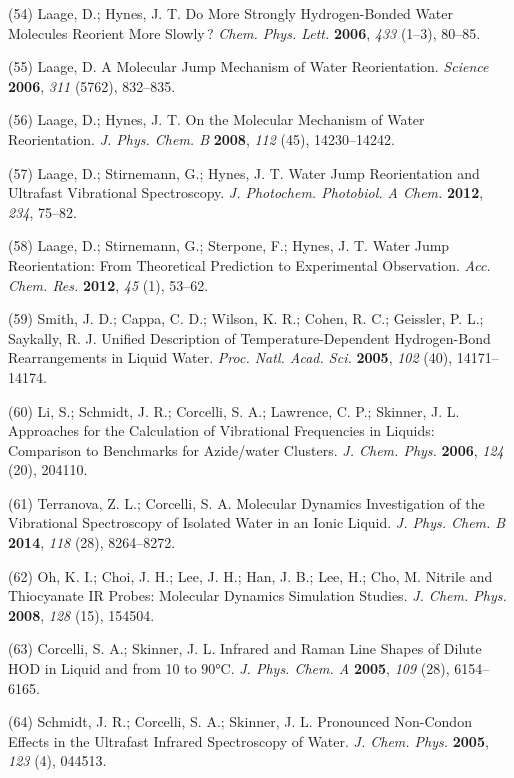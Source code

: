 \documentclass[]{article}
\begin{document}
(54) Laage, D.; Hynes, J. T. Do More Strongly Hydrogen-Bonded Water Molecules Reorient More Slowly\,? \emph{Chem. Phys. Lett.}  \textbf{2006}, \emph{433} (1--3), 80--85.

(55) Laage, D. A Molecular Jump Mechanism of Water Reorientation.  \emph{Science} \textbf{2006}, \emph{311} (5762), 832--835.

(56) Laage, D.; Hynes, J. T. On the Molecular Mechanism of Water Reorientation. \emph{J. Phys. Chem. B} \textbf{2008}, \emph{112} (45), 14230--14242.

(57) Laage, D.; Stirnemann, G.; Hynes, J. T. Water Jump Reorientation and Ultrafast Vibrational Spectroscopy. \emph{J. Photochem. Photobiol. A Chem.} \textbf{2012}, \emph{234}, 75--82.

(58) Laage, D.; Stirnemann, G.; Sterpone, F.; Hynes, J. T. Water Jump Reorientation: From Theoretical Prediction to Experimental Observation.  \emph{Acc. Chem. Res.} \textbf{2012}, \emph{45} (1), 53--62.

(59) Smith, J. D.; Cappa, C. D.; Wilson, K. R.; Cohen, R. C.; Geissler, P. L.; Saykally, R. J. Unified Description of Temperature-Dependent Hydrogen-Bond Rearrangements in Liquid Water. \emph{Proc. Natl. Acad.  Sci.} \textbf{2005}, \emph{102} (40), 14171--14174.

(60) Li, S.; Schmidt, J. R.; Corcelli, S. A.; Lawrence, C. P.; Skinner, J. L. Approaches for the Calculation of Vibrational Frequencies in Liquids: Comparison to Benchmarks for Azide/water Clusters. \emph{J.  Chem. Phys.} \textbf{2006}, \emph{124} (20), 204110.

(61) Terranova, Z. L.; Corcelli, S. A. Molecular Dynamics Investigation of the Vibrational Spectroscopy of Isolated Water in an Ionic Liquid.  \emph{J. Phys. Chem. B} \textbf{2014}, \emph{118} (28), 8264--8272.

(62) Oh, K. I.; Choi, J. H.; Lee, J. H.; Han, J. B.; Lee, H.; Cho, M.  Nitrile and Thiocyanate IR Probes: Molecular Dynamics Simulation Studies. \emph{J. Chem. Phys.} \textbf{2008}, \emph{128} (15), 154504.

(63) Corcelli, S. A.; Skinner, J. L. Infrared and Raman Line Shapes of Dilute HOD in Liquid  and  from 10 to 90°C. \emph{J. Phys. Chem. A} \textbf{2005}, \emph{109} (28), 6154--6165.

(64) Schmidt, J. R.; Corcelli, S. A.; Skinner, J. L. Pronounced Non-Condon Effects in the Ultrafast Infrared Spectroscopy of Water.  \emph{J. Chem. Phys.} \textbf{2005}, \emph{123} (4), 044513.
\end{document}
